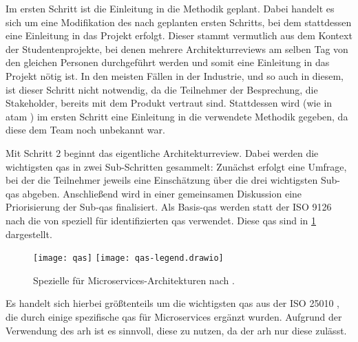 Im ersten Schritt ist die Einleitung in die Methodik geplant.
Dabei handelt es sich um eine Mo\-di\-fi\-ka\-ti\-on des nach  geplanten ersten Schritts, bei dem stattdessen eine Einleitung in das Projekt erfolgt.
Dieser stammt vermutlich aus dem Kontext der Studentenprojekte, bei denen mehrere Architekturreviews am selben Tag von den gleichen Personen durchgeführt werden und somit eine Einleitung in das Projekt nötig ist.
In den meisten Fällen in der Industrie, und so auch in diesem, ist dieser Schritt nicht notwendig, da die Teilnehmer der Besprechung, die Stakeholder, bereits mit dem Produkt vertraut sind.
Stattdessen wird (wie in \gls{atam} \cite{kazman_2000}) im ersten Schritt eine Einleitung in die verwendete Methodik gegeben, da diese dem Team noch unbekannt war.

Mit Schritt 2 beginnt das eigentliche Architekturreview.
Dabei werden die wichtigsten \glspl{qa} in zwei Sub-Schritten gesammelt:
Zunächst erfolgt eine Umfrage, bei der die Teilnehmer jeweils eine Einschätzung über die drei wichtigsten Sub-\glspl{qa} abgeben.
Anschließend wird in einer gemeinsamen Diskussion eine Priorisierung der Sub-\glspl{qa} finalisiert.
Als Basis-\glspl{qa} werden statt der ISO 9126~\cite{ISO-9126} nach  die von  speziell für  identifizierten \glspl{qa} verwendet.
Diese \glspl{qa} sind in \cref{fig:qas} dargestellt.
\begin{figure}[!h]
	\centering
	\texttt{[image: qas]}
	\texttt{[image: qas-legend.drawio]}
	\caption[Spezielle  für Microservices-Architekturen]{
		Spezielle  für Microservices-Architekturen nach .
	}
	\label{fig:qas}
\end{figure}
Es handelt sich hierbei größtenteils um die wichtigsten \glspl{qa} aus der ISO 25010 \cite{ISO-25010}, die durch einige spezifische \glspl{qa} für Microservices ergänzt wurden.
Aufgrund der Verwendung des \gls{arh} ist es sinnvoll, diese zu nutzen, da der \gls{arh} nur diese zulässt.

